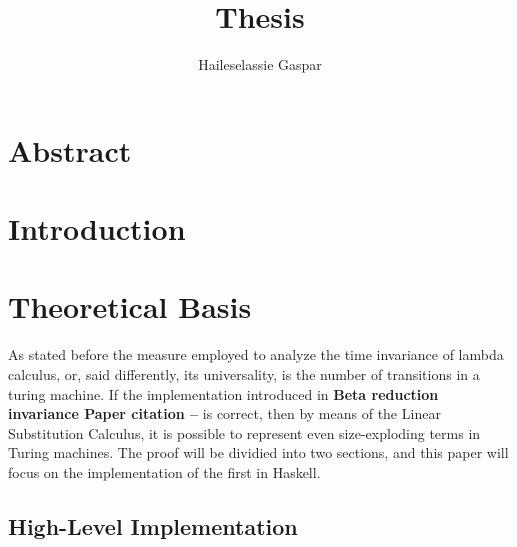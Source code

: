 \documentclass[12pt]{article}
\title{Thesis}
\author{Haileselassie Gaspar}
\begin{document}
\maketitle

\section{Abstract}
\section{Introduction}
\section{Theoretical Basis}
As stated before the measure employed to analyze the time invariance of lambda calculus, or, said differently, its universality, is the number of transitions in a turing machine. If the implementation introduced in \textbf{Beta reduction invariance Paper citation --} is correct, then by means of the Linear Substitution Calculus, it is possible to represent even size-exploding terms in Turing machines. The proof will be dividied into two sections, and this paper will focus on the implementation of the first in Haskell.
\subsection{High-Level Implementation}
\end{document}
